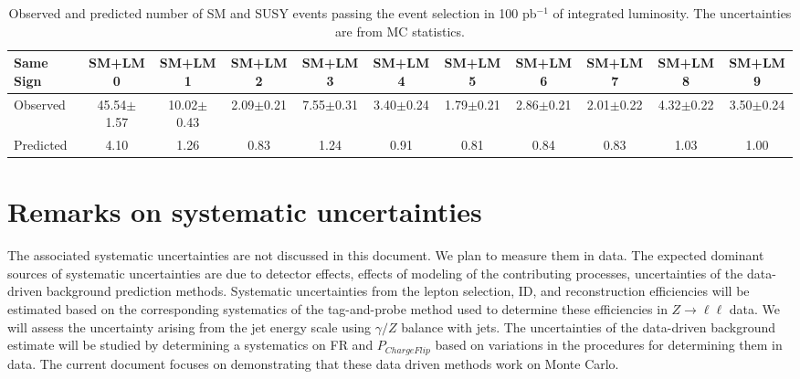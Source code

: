 \vspace{0.9mm}
\begin{table}[hbt]
\begin{center}
\renewcommand{\arraystretch}{1.2}
{\footnotesize\addtolength{\tabcolsep}{-4pt} 
\begin{tabular}{|l|c|c|c|c|c|c|c|c|c|c|}\hline
Same Sign & SM+LM0 & SM+LM1 & SM+LM2 & SM+LM3 & SM+LM4 & SM+LM5 & SM+LM6 & SM+LM7 & SM+LM8 & SM+LM9 \\ \hline
Observed & 45.54$\pm$1.57 & 10.02$\pm$0.43 & 2.09$\pm$0.21 & 7.55$\pm$0.31 & 3.40$\pm$0.24 & 1.79$\pm$0.21 & 2.86$\pm$0.21 & 2.01$\pm$0.22 & 4.32$\pm$0.22 & 3.50$\pm$0.24 \\ \hline
Predicted & 4.10 & 1.26 & 0.83 & 1.24 &	0.91 &	0.81 &	0.84 &	0.83 &	1.03 &	1.00 \\ \hline
\end{tabular} }
\caption{Observed and predicted  number of SM and SUSY events passing the event selection in 100 pb$^{-1}$ of integrated
luminosity. The uncertainties are from MC statistics.\label{tab:yieldsSUSY}}
\end{center}
\end{table}

\section{Remarks on systematic uncertainties}
\label{sec:systematics}
The associated systematic uncertainties are not discussed in this document. We plan to measure
them in data. The expected dominant sources of systematic uncertainties 
are due to detector effects, effects 
of modeling of the contributing processes, uncertainties of the data-driven background 
prediction methods.  Systematic uncertainties from the lepton selection, ID, and reconstruction efficiencies will be
estimated based on the corresponding systematics of the tag-and-probe method used to determine these efficiencies 
in $Z \rightarrow \ell \ell$ data. We will assess the uncertainty arising from the jet energy scale
using $\gamma/Z$ balance with jets. The uncertainties of the data-driven background estimate will be studied 
by determining a systematics on FR and $P_{ChargeFlip}$ based on variations in the procedures for determining them in data.
The current document focuses on demonstrating that these data driven methods work on Monte Carlo.

\clearpage
